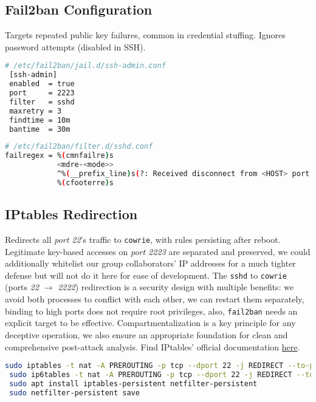 \documentclass{cls/ULBreport}
\begin{document}
        
        \subsection{Fail2ban Configuration}
        Targets repeated public key failures, common in credential stuffing. Ignores password attempts (disabled in SSH).
        
        \begin{lstlisting}[language=bash,caption={Custom Jail Rules}]
 # /etc/fail2ban/jail.d/ssh-admin.conf
 [ssh-admin]
 enabled  = true
 port     = 2223
 filter   = sshd
 maxretry = 3  
 findtime = 10m
 bantime  = 30m
        \end{lstlisting}
        
        \begin{lstlisting}[language=bash,caption={Regex Filter Against Key-Based Attacks}]
 # /etc/fail2ban/filter.d/sshd.conf
failregex = %(cmnfailre)s
            <mdre-<mode>>
            ^%(__prefix_line)s(?: Received disconnect from <HOST> port \d+: Too many authentication failures | Disconnected from <HOST> port \d+ due to: Authentication failed for .* publickey )
            %(cfooterre)s
        \end{lstlisting}
        
        
        \subsection{IPtables Redirection}
        Redirects all \textit{port 22}'s traffic to \texttt{cowrie}, with rules persisting after reboot. Legitimate key-based accesses on \textit{port 2223} are separated and preserved, we could additionally whitelist our group collaborators' IP addresses for a much tighter defense but will not do it here for ease of development. The \texttt{sshd} to \texttt{cowrie} ({ports \textit{22}} $\rightarrow$ \textit{2222}) redirection is a security design with multiple benefits: we avoid both processes to conflict with each other, we can restart them separately, binding to high ports does not require root privileges, also, \texttt{fail2ban} needs an explicit target to be effective. Compartmentalization is a key principle for any deceptive operation, we also ensure an appropriate foundation for clean and comprehensive post-attack analysis. Find IPtables' official documentation \href{https://linux.die.net/man/8/iptables}{here}. 
        \begin{lstlisting}[language=bash,caption={Traffic Redirection to Cowrie}]
 sudo iptables -t nat -A PREROUTING -p tcp --dport 22 -j REDIRECT --to-port 2222
 sudo ip6tables -t nat -A PREROUTING -p tcp --dport 22 -j REDIRECT --to-port 2222
 sudo apt install iptables-persistent netfilter-persistent
 sudo netfilter-persistent save
        \end{lstlisting}
        
\end{document}
